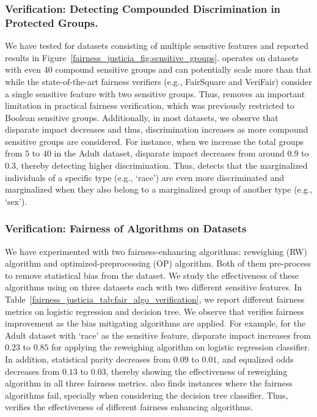 \subsubsection{Verification: Detecting Compounded Discrimination in Protected Groups.}
We have tested {\justicia} for datasets consisting of multiple sensitive features and reported results in Figure~\ref{fairness_justicia_fig:sensitive_groups}. {\justicia} operates on datasets with even 40 compound sensitive groups and can potentially scale more than that while the state-of-the-art fairness verifiers (e.g., FairSquare and VeriFair) consider a single sensitive feature with two sensitive groups. Thus, {\justicia} removes an important limitation in practical fairness verification, which was previously restricted to Boolean sensitive groups. Additionally, in most datasets, we observe that disparate impact decreases and thus, discrimination increases as more compound sensitive groups are considered. For instance, when we increase the total  groups from $ 5 $ to $ 40 $ in the Adult dataset, disparate impact decreases from around $ 0.9 $ to $ 0.3 $, thereby detecting higher discrimination. Thus, {\justicia} detects that the marginalized individuals of a specific type (e.g., `race')  are even more discriminated and marginalized when they also belong to a marginalized group of another type (e.g., `sex').





\subsubsection{Verification: Fairness of Algorithms on Datasets}
We have experimented with two fairness-enhancing algorithms: reweighing (RW) algorithm and optimized-preprocessing (OP) algorithm. Both of them pre-process to remove statistical bias from the dataset. We study the effectiveness of these algorithms using {\justicia} on three datasets each with two different sensitive features.  
In Table~\ref{fairness_justicia_tab:fair_algo_verification}, we report different fairness metrics on logistic regression and decision tree. We observe that {\justicia} verifies fairness improvement as the bias mitigating algorithms are applied.  For example, for the Adult dataset with `race' as the sensitive feature, disparate impact increases from $ 0.23 $ to $ 0.85 $ for applying the reweighing algorithm on logistic regression classifier. In addition, statistical parity decreases from $ 0.09 $ to $ 0.01 $, and equalized odds decreases from $ 0.13 $ to $ 0.03 $, thereby showing the effectiveness of reweighing algorithm in all three fairness metrics. 
{\justicia} also finds instances where the fairness algorithms fail, specially when considering the decision tree classifier. 
Thus, {\justicia} verifies the effectiveness of different fairness enhancing algorithms.

